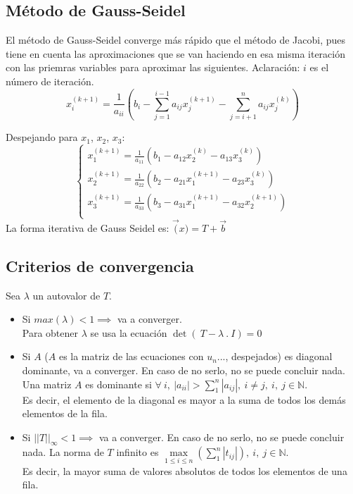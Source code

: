 \subsection{Método de Gauss-Seidel}
El método de Gauss-Seidel converge más rápido que el método de Jacobi, pues tiene en cuenta las aproximaciones que se van haciendo en esa misma iteración con las priemras variables para aproximar las siguientes.
Aclaración: $i$ es el número de iteración.
\begin{equation}
    x_i^{(k+1)} = \frac{1}{a_{ii}} \left( b_i - \sum_{j=1}^{i-1} a_{ij} x_j^{(k+1)} - \sum_{j=i+1}^{n} a_{ij} x_j^{(k)} \right)
\end{equation}

Despejando para $x_1$, $x_2$, $x_3$:
\begin{equation}
    \begin{cases}
        x_1^{(k+1)} = \frac{1}{a_{11}} \left( b_1 - a_{12}x_2^{(k)} - a_{13}x_3^{(k)} \right)\\
        x_2^{(k+1)} = \frac{1}{a_{22}} \left( b_2 - a_{21}x_1^{(k+1)} - a_{23}x_3^{(k)} \right)\\
        x_3^{(k+1)} = \frac{1}{a_{33}} \left( b_3 - a_{31}x_1^{(k+1)} - a_{32}x_2^{(k+1)} \right)\\
    \end{cases}
\end{equation}
La forma iterativa de Gauss Seidel es:
$\vec(x)=T+\vec{b}$ \\
\subsection{Criterios de convergencia}
Sea $\lambda$ un autovalor de $T$.
\begin{itemize}
\item Si $max(\lambda)<1 \implies $ va a converger.\\
Para obtener $\lambda$ se usa la ecuación $\det(\ T-\lambda\ .\ I)=0$
\item Si $A$ ($A$ es la matriz de las ecuaciones con $u_n$..., despejados) es diagonal dominante, va a converger. En caso de no serlo, no se puede concluir nada.\\
Una matriz $A$ es dominante si $\forall\ i,\ |a_{ii}|>\sum_{1}^{n}|a_{ij}|,\ i\ne j,\ i,\ j \in \mathbb{N}$.\\
Es decir, el elemento de la diagonal es mayor a la suma de todos los demás elementos de la fila.
\item Si $||T||_\infty<1 \implies$ va a converger. En caso de no serlo, no se puede concluir nada.
La norma de $T$ infinito es $\max\limits_{1 \leq i \leq n}\left(\sum_{1}^{n}|t_{ij}|\right),\ i,\ j \in \mathbb{N}$.\\
Es decir, la mayor suma de valores absolutos de todos los elementos de una fila.
\end{itemize}